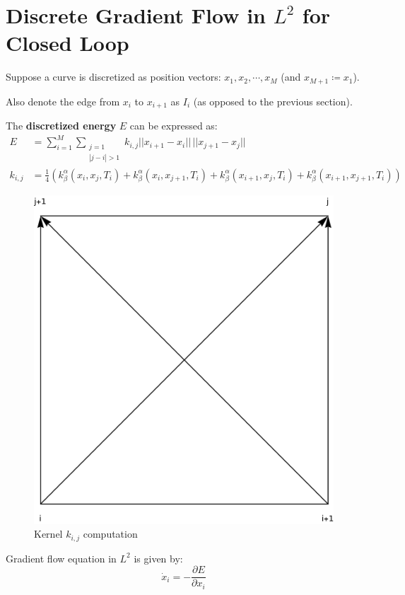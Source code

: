 \documentclass[a4paper, 11pt]{article}
\newcommand{\norm}[1]{||#1||}
\begin{document}
\section{Discrete Gradient Flow in $L^2$ for Closed Loop}
Suppose a curve is discretized as position vectors:
$x_1, x_2, \cdots, x_M$ (and $x_{M+1} \coloneqq x_1$).

Also denote the edge from $x_i$ to $x_{i+1}$ as $I_i$ (as opposed to the previous section).

The \textbf{discretized energy} $E$ can be expressed as:
\begin{align}
    E &= \sum_{i = 1}^{M} \sum_{\substack{j = 1 \\ |j-i| > 1}} k_{i,j} \norm{x_{i+1} - x_i} \, \norm{x_{j+1} - x_j} \\
    k_{i,j} &= \frac{1}{4} \left( 
        k_{\beta}^{\alpha} \left( x_i, x_j, T_i \right)
        + k_{\beta}^{\alpha} \left( x_i, x_{j+1}, T_i \right)
        + k_{\beta}^{\alpha} \left( x_{i+1}, x_j, T_i \right)
        + k_{\beta}^{\alpha} \left( x_{i+1}, x_{j+1}, T_i \right)
    \right)
\end{align}

\begin{figure}[h]
    \centering
    \includegraphics[scale=0.6]{kernel-2x2.png}
    \caption{Kernel $k_{i,j}$ computation}
\end{figure}

Gradient flow equation in $L^2$ is given by:
\begin{equation}
    \dot{x}_i = - \frac{\partial E}{\partial x_i}
\end{equation}
\end{document}
